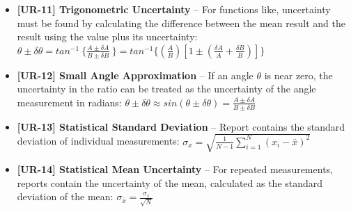 \documentclass{article}
\begin{document}
\begin{itemize}
\item \textbf{ [UR-11] Trigonometric Uncertainty } – For functions like, uncertainty must be found by calculating the difference between the mean result and the result using the value plus its uncertainty: $ \theta \pm \delta \theta = tan^{-1}\ \{ \frac {A \pm \delta A}{B \pm \delta B}\ \} = tan^{-1} \{  \left( \frac{A}{B} \right) \left[ 1 \pm \left( \frac{\delta A}{A} + \frac{\delta B}{B} \right) \right]  \} $
\item \textbf{ [UR-12] Small Angle Approximation } – If an angle $\theta$ is near zero, the uncertainty in the ratio can be treated as the uncertainty of the angle measurement in radians: $ \theta \pm \delta \theta \approx sin( \theta \pm \delta \theta) = \frac { A \pm \delta A } { B \pm \delta B } $
\item \textbf{ [UR-13] Statistical Standard Deviation } – Report contains the standard deviation of individual measurements: $ \sigma_x = \sqrt{\frac{1}{N-1} \sum_{i=1}^{N} (x_i - \bar{x})^2} $ 
\item \textbf{ [UR-14] Statistical Mean Uncertainty } – For repeated measurements, reports contain the uncertainty of the mean, calculated as the standard deviation of the mean: $ \sigma_{ \bar{x} } = \frac{\sigma_x}{\sqrt{N}} $
\end{itemize}
\end{document}
